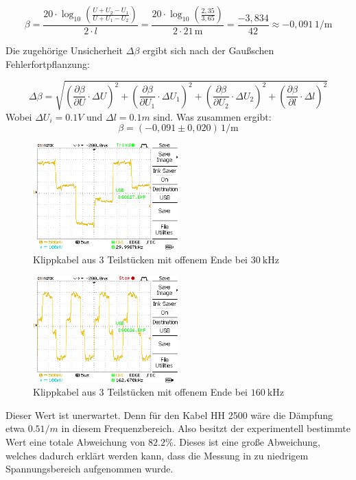\documentclass{article}
\begin{document}
\[
\beta = \frac{20 \cdot \log_{10} \left( \frac{U + U_2 - U_1}{U + U_1 - U_2} \right)}{2 \cdot l}
= \frac{20 \cdot \log_{10} \left( \frac{2{,}35}{3{,}65} \right)}{2 \cdot 21\,\text{m}}
= \frac{-3{,}834}{42} \approx -0{,}091\,\text{1/m}
\]


Die zugehörige Unsicherheit \( \Delta\beta \) ergibt sich nach der Gaußschen Fehlerfortpflanzung:

\[
\Delta \beta = \sqrt{
\left( \frac{\partial \beta}{\partial U} \cdot \Delta U \right)^2 +
\left( \frac{\partial \beta}{\partial U_1} \cdot \Delta U_1 \right)^2 +
\left( \frac{\partial \beta}{\partial U_2} \cdot \Delta U_2 \right)^2 +
\left( \frac{\partial \beta}{\partial l} \cdot \Delta l \right)^2
}
\]
Wobei $\Delta U_i =0.1V$ und $\Delta l =0.1m$ sind.
Was zusammen ergibt: 
\[
\beta = (-0{,}091 \pm 0{,}020)\,\text{1/m}
\]



 \begin{figure}[H]
    \centering
    \includegraphics[width=0.5\textwidth]{MesswerteVersuch1/DS0027.png}
    \caption{Klippkabel aus 3 Teilstücken mit offenem Ende bei $\SI{30}{\kilo\hertz}$}
    \label{fig:DS0029}
\end{figure}
\begin{figure}[H]
    \centering
    \includegraphics[width=0.5\textwidth]{MesswerteVersuch1/DS0026.png}
    \caption{Klippkabel aus 3 Teilstücken mit offenem Ende bei $\SI{160}{\kilo\hertz}$}
    \label{fig:DS0030}
\end{figure}

Dieser Wert ist unerwartet. Denn für den Kabel HH 2500 wäre die Dämpfung etwa $0.5 1/m$ in diesem Frequenzbereich.
Also besitzt der experimentell bestimmte Wert eine totale Abweichung von $82.2\%$. 
Dieses ist eine große Abweichung, welches dadurch erklärt werden kann, dass die Messung in zu niedrigem Spannungsbereich aufgenommen wurde.  
		
\end{document}
